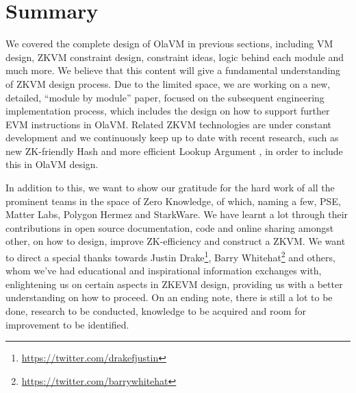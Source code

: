 \section{Summary}

We covered the complete design of OlaVM in previous sections, including VM design, ZKVM constraint design, constraint ideas, logic behind each module and much more. We believe that this content will give a fundamental understanding of ZKVM design process. Due to the limited space, we are working on a new, detailed, ``module by module'' paper, focused on the subsequent engineering implementation process, which includes the design on how to support further EVM instructions in OlaVM. Related ZKVM technologies are under constant development and we continuously keep up to date with recent research, such as new ZK-friendly Hash and more efficient Lookup Argument \cite{cryptoeprint:2022/621}, in order to include this in OlaVM design.

In addition to this, we want to show our gratitude for the hard work of all the prominent teams in the space of Zero Knowledge, of which, naming a few, PSE, Matter Labs, Polygon Hermez and StarkWare. We have learnt a lot through their contributions in open source documentation, code and online sharing amongst other, on how to design, improve ZK-efficiency and construct a ZKVM. We want to direct a special thanks towards Justin Drake\footnote{\url{https://twitter.com/drakefjustin}}, Barry Whitehat\footnote{\url{https://twitter.com/barrywhitehat}} and others, whom we've had educational and inspirational information exchanges with, enlightening us on certain aspects in ZKEVM design, providing us with a better understanding on how to proceed. On an ending note, there is still a lot to be done, research to be conducted, knowledge to be acquired and room for improvement to be identified.
